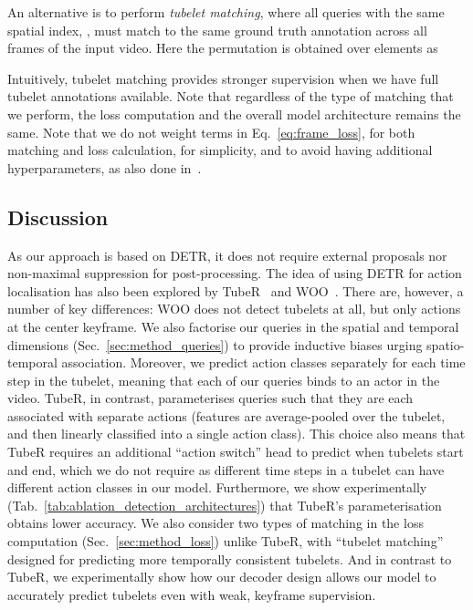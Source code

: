 \documentclass[10pt,twocolumn,letterpaper]{article}
\begin{document}
An alternative is to perform \textit{tubelet matching}, where all queries with the same spatial index, , must match to the same ground truth annotation across all frames of the input video.
Here the permutation is obtained over  elements as

Intuitively, tubelet matching provides stronger supervision when we have full tubelet annotations available. Note that regardless of the type of matching that we perform, the loss computation and the overall model architecture remains the same.
Note that we do not weight terms in Eq.~\ref{eq:frame_loss}, for both matching and loss calculation, for simplicity, and to avoid having additional hyperparameters, as also done in~\cite{minderer2022simple}.


\subsection{Discussion}
\label{sec:method_discussion}

As our approach is based on DETR, it does not require external proposals nor non-maximal suppression for post-processing.
The idea of using DETR for action localisation has also been explored by TubeR~\cite{zhao2022tuber} and WOO~\cite{chen2021watch}.
There are, however, a number of key differences:
WOO does not detect tubelets at all, but only actions at the center keyframe. We also factorise our queries in the spatial and temporal dimensions (Sec.~\ref{sec:method_queries}) to provide inductive biases urging spatio-temporal association. Moreover, we predict action classes separately for each time step in the tubelet, meaning that each of our queries binds to an actor in the video. TubeR, in contrast, parameterises queries such that they are each associated with separate actions (features are average-pooled over the tubelet, and then linearly classified into a single action class).
This choice also means that TubeR requires an additional ``action switch'' head to predict when tubelets start and end, which we do not require as different time steps in a tubelet can have different action classes in our model.
Furthermore, we show experimentally (Tab.~\ref{tab:ablation_detection_architectures}) that TubeR's parameterisation obtains lower accuracy.
We also consider two types of matching in the loss computation (Sec.~\ref{sec:method_loss}) unlike TubeR, with ``tubelet matching'' designed for predicting more temporally consistent tubelets.
And in contrast to TubeR, we experimentally show how our decoder design allows our model to accurately predict tubelets even with weak, keyframe supervision. 
\end{document}
